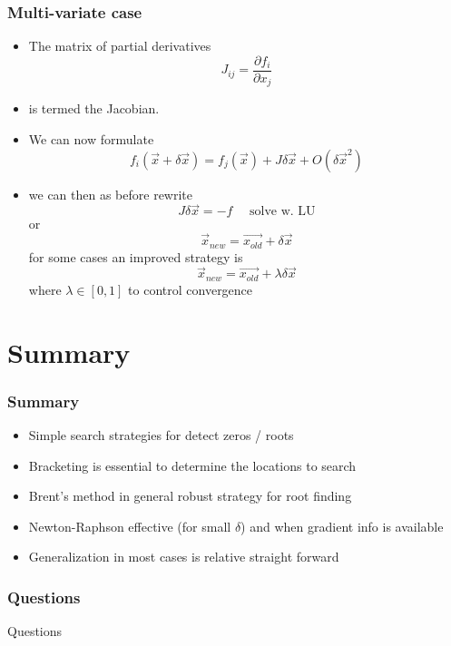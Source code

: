 \documentclass[10pt]{beamer}
\begin{document}
\begin{frame}
  \frametitle{Multi-variate case}
  \begin{itemize}
  \item The matrix of partial derivatives
    \[
      J_{ij} = \frac{\partial f_i}{\partial x_j}
    \]
  \item is termed the Jacobian. 
  \item We can now formulate
    \[
      f_i (\vec{x} + \delta\vec{x}) = f_j(\vec{x}) + J \delta \vec{x} + O(\delta\vec{x}^2)
    \]
  \item we can then as before rewrite
    \[
      J \delta \vec{x} = -f \mbox{ ~~ solve w. LU}
    \]
    or
    \[
      \vec{x}_{new} = \vec{x_{old}} + \delta \vec{x}
    \]
    for some cases an improved strategy is 
    \[
      \vec{x}_{new} = \vec{x_{old}} + \lambda \delta \vec{x}
    \] where $\lambda \in [0,1]$ to control convergence
  \end{itemize}
\end{frame}

\section{Summary}

\begin{frame}
  \frametitle{Summary}
  \begin{itemize}
  \item Simple search strategies for detect zeros / roots
  \item Bracketing is essential to determine the locations to search
  \item Brent's method in general robust strategy for root finding
  \item Newton-Raphson effective (for small $\delta$) and when gradient info is available
  \item Generalization in most cases is relative straight forward
  \end{itemize}
\end{frame}

\begin{frame}
  \frametitle{Questions}
  \centerline{\Huge Questions}
\end{frame}
\end{document}
